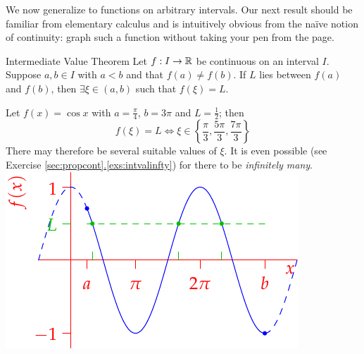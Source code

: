 We now generalize to functions on arbitrary intervals. Our next result should be familiar from elementary calculus and is intuitively obvious from the naïve notion of continuity: graph such a function without taking your pen from the page.

\begin{thm}{Intermediate Value Theorem}{}
Let $f:I\to\mathbb{R}$ be continuous on an interval $I$. Suppose $a,b\in I$ with $a<b$ and that $f(a)\neq f(b)$. If $L$ lies between $f(a)$ and $f(b)$, then $\exists \xi\in(a,b)$ such that $f(\xi)=L$.
\end{thm}


\begin{example}[lower separated=false, sidebyside, sidebyside align=top seam, sidebyside gap=0pt, righthand width=0.45\linewidth]{}{}
Let $f(x)=\cos x$ with $a=\frac\pi 4$, $b=3\pi$ and $L=\frac 12$; then
\[f(\xi)=L\iff \xi\in\left\{\frac\pi 3,\frac{5\pi}3,\frac{7\pi}3\right\}\]
There may therefore be several suitable values of $\xi$. It is even possible (see Exercise \hyperref[exs:intvalinfty]{\ref*{sec:propcont}.\ref*{exs:intvalinfty}}) for there to be \emph{infinitely many}.
\tcblower
\flushright\includegraphics{intval2}
\end{example} \pagebreak

